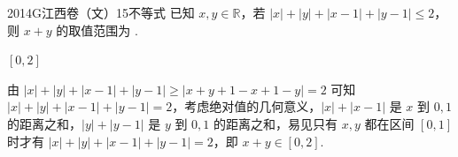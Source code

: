 
\begin{problem}{2014}{G}{江西卷（文）}{15}{不等式}
已知 $ x,y\in\mathbb{R} $，若 $ |x|+|y|+|x-1|+|y-1|\leq 2 $，则 $ x+y $ 的取值范围为 \underline{\hspace{4em}}.
\end{problem}

\begin{answer}
$ [0,2] $
\end{answer}

\begin{solutions}
由 $ |x|+|y|+|x-1|+|y-1|\geq|x+y+1-x+1-y|=2 $ 可知  
$ |x|+|y|+|x-1|+|y-1|=2 $，考虑绝对值的几何意义，$ |x|+|x-1| $ 是 $ x $ 到 $ 0,1 $ 的距离之和，$ |y|+|y-1| $ 是 $ y $ 到 $ 0,1 $ 的距离之和，易见只有 $ x,y $ 都在区间 $ [0,1] $ 时才有 $ |x|+|y|+|x-1|+|y-1|=2 $，即 $ x+y\in[0,2] $.
\end{solutions}